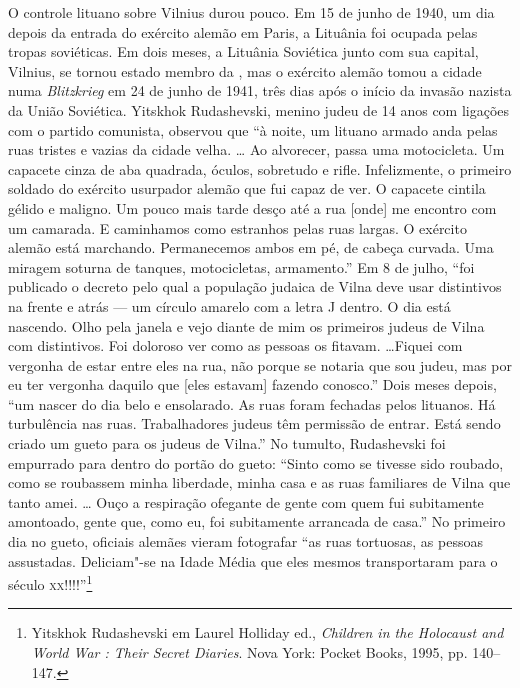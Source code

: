 O controle lituano sobre Vilnius durou pouco. Em 15 de junho de 1940, um
dia depois da entrada do exército alemão em Paris, a Lituânia foi
ocupada pelas tropas soviéticas. Em dois meses, a Lituânia Soviética
junto com sua capital, Vilnius, se tornou estado membro da , mas o
exército alemão tomou a cidade numa \textit{Blitzkrieg} em 24 de junho de
1941, três dias após o início da invasão nazista da União Soviética.
Yitskhok Rudashevski, menino judeu de 14 anos com ligações com o partido
comunista, observou que ``à noite, um lituano armado anda pelas ruas
tristes e vazias da cidade velha. \ldots{} Ao alvorecer, passa uma
motocicleta. Um capacete cinza de aba quadrada, óculos, sobretudo e
rifle. Infelizmente, o primeiro soldado do exército usurpador alemão que
fui capaz de ver. O capacete cintila gélido e maligno. Um pouco mais
tarde desço até a rua {[}onde{]} me encontro com um camarada. E
caminhamos como estranhos pelas ruas largas. O exército alemão está
marchando. Permanecemos ambos em pé, de cabeça curvada. Uma miragem
soturna de tanques, motocicletas, armamento.'' Em 8 de julho, ``foi
publicado o decreto pelo qual a população judaica de Vilna deve usar
distintivos na frente e atrás --- um círculo amarelo com a letra J dentro.
O dia está nascendo. Olho pela janela e vejo diante de mim os primeiros
judeus de Vilna com distintivos. Foi doloroso ver como as pessoas os
fitavam. \ldots{}Fiquei com vergonha de estar entre eles na rua, não
porque se notaria que sou judeu, mas por eu ter vergonha daquilo que
{[}eles estavam{]} fazendo conosco.'' Dois meses depois, ``um nascer do
dia belo e ensolarado. As ruas foram fechadas pelos lituanos. Há
turbulência nas ruas. Trabalhadores judeus têm permissão de entrar. Está
sendo criado um gueto para os judeus de Vilna.'' No tumulto, Rudashevski
foi empurrado para dentro do portão do gueto: ``Sinto como se tivesse
sido roubado, como se roubassem minha liberdade, minha casa e as ruas
familiares de Vilna que tanto amei. \ldots{} Ouço a respiração ofegante
de gente com quem fui subitamente amontoado, gente que, como eu, foi
subitamente arrancada de casa.'' No primeiro dia no gueto, oficiais
alemães vieram fotografar ``as ruas tortuosas, as pessoas assustadas.
Deliciam"-se na Idade Média que eles mesmos transportaram para o século
\textsc{xx}!!!!''\footnote{Yitskhok Rudashevski em Laurel Holliday ed., \textit{Children in the Holocaust and World War : Their Secret Diaries}. Nova York: Pocket Books, 1995, pp. 140--147.}

